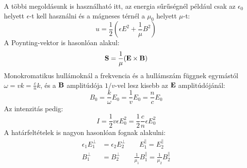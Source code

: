 \documentclass[../main.tex]{subfiles}
\begin{document}
A többi megoldásunk is használható itt, az energia sűrűségnél például csak az $\epsilon_0$ helyett $\epsilon$-t kell használni és a mágneses térnél a $\mu_0$ helyett $\mu$-t:
\begin{equation}
    u = \frac{1}{2} \left( \epsilon E^2 + \frac{1}{\mu} B^2 \right)
\end{equation}
A Poynting-vektor is hasonlóan alakul:
\begin{equation}
    \bold{S} = \frac{1}{\mu} (\bold{E} \times \bold{B})
\end{equation}
Monokromatikus hullámoknál a frekvencia és a hullámszám függnek egymástól $\omega = vk = \frac{c}{n} k$, és a $\bold{B}$ amplitúdója $1/v$-vel lesz kisebb az $\bold{E}$ amplitúdójánál:
\begin{equation}
    B_0 = \frac{k}{\omega} E_0 = \frac{1}{v} E_0 = \frac{n}{c} E_0
\end{equation}
Az intenzitás pedig:
\begin{equation}
    I = \frac{1}{2} v \epsilon E_0^2 = \frac{1}{2} \frac{c}{n} \epsilon E_0^2
\end{equation}
A határfeltételek is nagyon hasonlóan fognak alakulni:
\begin{equation}
    \begin{aligned}
        \epsilon_1 E_1^\perp &= \epsilon_2 E_2^\perp \qquad E_{1}^\parallel = E_{2}^\parallel \\
        B_1^\perp &= B_2^\perp \qquad \frac{1}{\mu_1} B_{1}^\parallel = \frac{1}{\mu_2} B_{2}^\parallel
    \end{aligned}
\end{equation}
\end{document}

